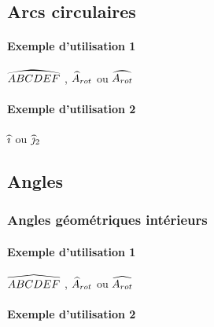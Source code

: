 \documentclass[12pt,a4paper]{article}
\theoremstyle{definition}
\begin{document}
\subsection{Arcs circulaires}

\paragraph{Exemple d'utilisation 1}

\begin{latexex}
$\circarc{ABCDEF}$ ,
$\circarc*{A}{rot}$ ou
$\circarc{A_{rot}}$
\end{latexex}




\paragraph{Exemple d'utilisation 2}

\begin{latexex}
$\circarc{i}$ ou
$\circarc*{j}{2}$
\end{latexex}



\subsection{Angles}

\subsubsection{Angles géométriques \og intérieurs \fg}

\paragraph{Exemple d'utilisation 1}

\begin{latexex}
$\anglein{ABCDEF}$ ,
$\anglein*{A}{rot}$ ou
$\anglein{A_{rot}}$
\end{latexex}




\paragraph{Exemple d'utilisation 2}
\end{document}
